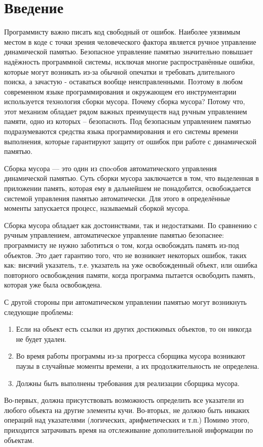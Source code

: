 \setcounter{page}{4}
\section*{Введение}
Программисту важно писать  код свободный от ошибок. Наиболее уязвимым местом в коде с точки зрения человеческого фактора является ручное управление динамической памятью.  Безопасное управление памятью значительно повышает надёжность программной системы, исключая многие распространённые ошибки, которые могут возникать из-за обычной опечатки и требовать длительного поиска, а зачастую  -  оставаться вообще неисправленными. Поэтому в любом современном языке программирования и окружающем его инструментарии используется технология сборки мусора. Почему сборка мусора? Потому что, этот механизм обладает рядом важных преимуществ над ручным управлением памяти, одно из которых -- безопасноть. Под безопасным управлением памятью подразумеваются средства языка программирования и его системы времени выполнения, которые гарантируют защиту от ошибок при работе с динамической памятью.
 
Сборка мусора — это один из споcобов автоматического управления динамической памятью. Суть сборки мусора заключается в том, что выделенная в приложении память, которая ему в дальнейшем не понадобится, освобождается системой управления памятью автоматически. Для этого в определённые моменты запускается процесс, называемый сборкой мусора.
 
Сборка мусора обладает как достоинствами, так и недостатками. По сравнению с ручным управлением, автоматическое управление памятью безопаснее: программисту не нужно заботиться о том, когда освобождать память из-под объектов. Это дает гарантию того, что не возникнет некоторых ошибок, таких как: висячий указатель, т.е. указатель на уже освобожденный объект, или ошибка повторного освобождения памяти, когда программа пытается освободить память, которая уже была освобождена.

С другой стороны при автоматическом управлении памятью могут возникнуть следующие проблемы:
\begin{enumerate}
\item Если на объект есть ссылки из других достижимых объектов, то он никогда не будет удален.
\item Во время работы программы из-за прогресса сборщика мусора возникают паузы в случайные моменты времени, а их продолжительность не определена.
\item  Должны быть выполнены требования для реализации сборщика мусора.
\end{enumerate}
Во-первых, должна присутствовать возможность определить все указатели из любого объекта на другие элементы кучи.
Во-вторых, не должно быть никаких операций над указателями (логических, арифметических и т.п.)
Помимо этого, приходится затрачивать время на отслеживание дополнительной информации по объектам.


